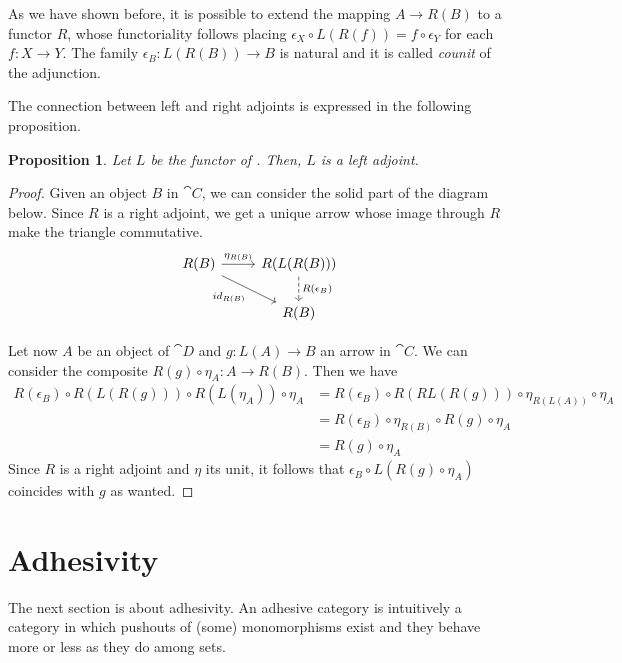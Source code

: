 \documentclass[a4paper, twoside,openright]{report}
\theoremstyle{plain}
\newtheorem{prop}[theorem]{Proposition}
\theoremstyle{definition}
\begin{document}
As we have shown before, it is possible to extend the mapping $A \rightarrow R(B)$ to a functor $R$, whose functoriality follows placing $\epsilon_X \circ L(R(f)) = f \circ \epsilon_Y$ for each $f: X \rightarrow Y$. The family $\epsilon_B : L(R(B)) \rightarrow B$ is natural and it is called \emph{counit} of the adjunction.

The connection between left and right adjoints is expressed in the following proposition.

\begin{prop}
    Let $L$ be the functor of . Then, $L$ is a left adjoint.
\end{prop}

\begin{proof}
	Given an object $B$ in $\cat{C}$, we can consider the solid part of the diagram below. 
	Since $R$ is a right adjoint, we get a unique arrow whose image through $R$ make the triangle commutative.
	    \[
	\begin{tikzcd}
		R(B)\arrow[r, "{\eta_{R(B)}}"] \arrow[dr, "id_{R(B)}" swap] & R(L(R(B))) \arrow[d, dashed, "R(\epsilon_B)"] \\
		& R(B)
	\end{tikzcd}
	\]
	
	Let now $A$ be an object of $\cat{D}$ and $g\colon L(A)\to B$ an arrow in $\cat{C}$. We can consider the composite $R(g)\circ \eta_A\colon A\to R(B)$. Then we have
	\begin{align*}
		R(\epsilon_B)\circ R(L(R(g)))\circ R(L(\eta_A))\circ \eta_A&=R(\epsilon_B)\circ R(RL(R(g)))\circ \eta_{R(L(A))}\circ \eta_A\\&=R(\epsilon_B)\circ \eta_{R(B)}\circ R(g)\circ \eta_A\\&=R(g)\circ \eta_A
	\end{align*}
	Since $R$ is a right adjoint and $\eta$ its unit, it follows that $\epsilon_B\circ L(R(g)\circ \eta_A)$ coincides with $g$ as wanted.
 \end{proof}


\section{Adhesivity}\label{sect:adh}

The next section is about adhesivity.
An adhesive category is intuitively a category in which pushouts of (some) monomorphisms exist and they behave more or less as they do among sets. 
\end{document}

